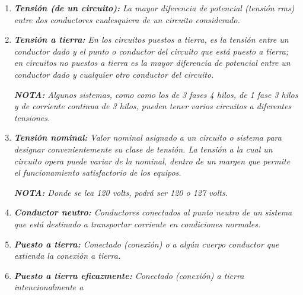 \documentclass[12pt,letterpaper]{article}
\begin{document}
\begin{enumerate}

\item \textit{\textbf{Tensión (de un circuito):} La mayor diferencia de potencial (tensión rms) entre dos conductores cualesquiera de un circuito considerado.}

\item \textit{\textbf{Tensión a tierra:} En los circuitos puestos a tierra, es la tensión entre un conductor dado y el punto o conductor del circuito que está puesto a tierra; en circuitos no puestos a tierra es la mayor diferencia de potencial entre un conductor dado y cualquier otro conductor del circuito.}

\textit{\textbf{NOTA:} Algunos sistemas, como como los de 3 fases 4 hilos, de 1 fase 3 hilos y de corriente continua de 3 hilos, pueden tener varios circuitos a diferentes tensiones.}

\item \textit{\textbf{Tensión nominal:} Valor nominal asignado a un circuito o sistema para designar convenientemente su clase de tensión. La tensión a la cual un circuito opera puede variar de la nominal, dentro de un margen que permite el funcionamiento satisfactorio de los equipos.}

\textit{\textbf{NOTA:} Donde se lea 120 volts, podrá ser 120 o 127 volts.\\}

\item \textit{\textbf{Conductor neutro:} Conductores conectados al punto neutro de un sistema que está destinado a transportar corriente en condiciones normales.\\}

\item \textit{\textbf{Puesto a tierra:} Conectado (conexión) o a algún cuerpo conductor que extienda la conexión a tierra.}

\item \textit{\textbf{Puesto a tierra eficazmente:} Conectado (conexión) a tierra intencionalmente a }

\end{enumerate}
\end{document}
